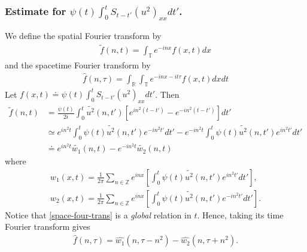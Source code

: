 \documentclass[12pt,reqno]{amsart}
\numberwithin{equation}{section}  %
\numberwithin{figure}{section}
\newcommand{\rr}{\mathbb{R}}
\newcommand{\zz}{\mathbb{Z}}
\newcommand{\ci}{\mathbb{T}}
\newcommand{\wh}{\widehat}
\newcommand{\wt}{\widetilde}
\theoremstyle{plain}
\theoremstyle{definition}
\theoremstyle{remark}
\begin{document}
\subsubsection{Estimate for $\psi(t) \int_{0}^{t} S_{t-t'} (u^{2})_{xx} dt'$.}
\label{sssec:non-lin-term}
We define the spatial Fourier transform by 
%
%
\begin{equation*}
\begin{split}
  \tilde{f}(n, t) = \int_{\ci} e^{-inx}f(x,t) dx
\end{split}
\end{equation*}
%
%
and the spacetime Fourier transform by
\begin{equation*}
\begin{split}
  \wh{f}(n, \tau) = \int_{\rr} \int_{\ci} e^{-inx-it\tau}f(x,t) dx dt
\end{split}
\end{equation*}
%
%
Let $f(x,t) \doteq \psi(t) \int_{0}^{t} S_{t-t'} (u^{2})_{xx} dt'$. 
Then
%
%
\begin{equation}
  \begin{split}
    \wt{f}(n, t)
    & = \frac{\psi(t)}{2i} \int_{0}^{t}\wt{u^{2}}(n, t') \left[
    e^{in^{2}(t-t')} - e^{-in^{2}(t-t')}
    \right] dt'
    \\
    & \simeq e^{in^{2}t} \int_{0}^{t} \psi(t) \wt{u^{2}}(n, t') e^{-in^{2}t'}
    dt' - 
    e^{-in^{2}t} \int_{0}^{t} \psi(t) \wt{u^{2}}(n, t') e^{in^{2}t'} dt'
    \\
    & \doteq e^{in^{2}t} \wt{w_1}(n, t) - e^{-in^{2}t} \wt{w_2}(n, t)
  \end{split}
  \label{space-four-trans}
\end{equation}
%
where
%
%
\begin{gather*}
  w_{1}(x,t) = \frac{1}{2 \pi} \sum_{n \in \zz} e^{inx} \left[ \int_{0}^{t} \psi(t) \wt{u^{2}}(n, t') e^{in^{2}t'}
  dt'\right],
  \\
  w_{2}(x,t) = \frac{1}{2 \pi} \sum_{n \in \zz} e^{inx} \left[ \int_{0}^{t} \psi(t) \wt{u^{2}}(n, t') e^{-in^{2}t'} dt'
 \right].
\end{gather*}
%
%
%
Notice that \eqref{space-four-trans} is a \emph{global} relation in $t$.
Hence, taking its time Fourier transform gives
%
%
\begin{equation}
  \label{full-fourier-trans-exp}
\begin{split}
  \wh{f}(n, \tau) = \wh{w_{1}}(n, \tau - n^{2}) - \wh{w_{2}}(n, \tau +
  n^{2}).
\end{split}
\end{equation}
%
\end{document}
